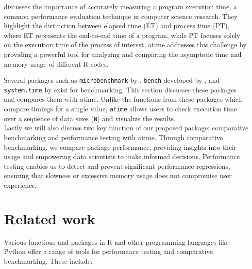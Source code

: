 \noindent \cite{suh2017emp} discusses the importance of accurately measuring a program execution time, a common performance evaluation technique in computer science research. They highlight the distinction between elapsed time (ET) and process time (PT), where ET represents the end-to-end time of a program, while PT focuses solely on the execution time of the process of interest, atime addresses this challenge by providing a powerful tool for analyzing and comparing the asymptotic time and memory usage of different R codes.

\noindent Several packages such as \texttt{microbenchmark} by \cite{microbenchmark}, \texttt{bench} developed by \cite{bench}, and \texttt{system.time} by \cite{system.time} exist for benchmarking. This section discusses these packages and compares them with atime. Unlike the functions from these packages which compare timings for a single value, \texttt{atime} allows users to check execution time over a sequence of data sizes (\texttt{N}) and visualize the results.\\ 

\noindent Lastly we will also discuss two key function of our proposed package: comparative benchmarking and performance testing with atime. Through comparative benchmarking, we compare package performance, providing insights into their usage and empowering data scientists to make informed decisions. Performance testing enables us to detect and prevent significant performance regressions, ensuring that slowness or excessive memory usage does not compromise user experience.\\

\section{Related work}

\noindent Various functions and packages in R and other programming languages like Python offer a range of tools for performance testing and comparative benchmarking. These include: 
\\

